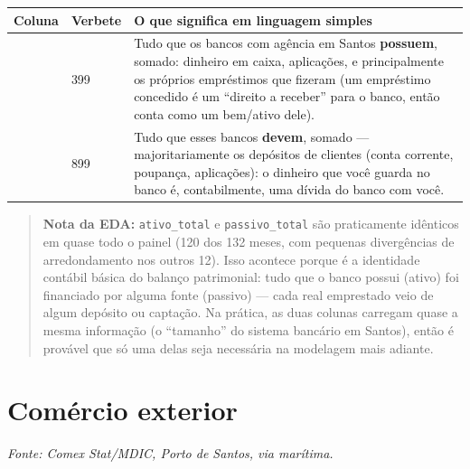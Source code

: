 \documentclass[11pt,a4paper]{article}
\begin{document}
\vspace{0.5em}
\begin{longtable}{L{2.6cm} L{1.4cm} L{9.8cm}}
\toprule
\textbf{Coluna} & \textbf{Verbete} & \textbf{O que significa em linguagem simples} \\
\midrule
\endhead
\texttt{} & 399 &
Tudo que os bancos com agência em Santos \textbf{possuem}, somado: dinheiro em caixa, aplicações, e principalmente os próprios empréstimos que fizeram (um empréstimo concedido é um ``direito a receber'' para o banco, então conta como um bem/ativo dele). \\[0.4em]
\texttt{} & 899 &
Tudo que esses bancos \textbf{devem}, somado --- majoritariamente os depósitos de clientes (conta corrente, poupança, aplicações): o dinheiro que você guarda no banco é, contabilmente, uma dívida do banco com você. \\
\bottomrule
\end{longtable}

\begin{quote}
\small\textbf{Nota da EDA:} \texttt{ativo\_total} e \texttt{passivo\_total} são praticamente idênticos em quase todo o painel (120 dos 132 meses, com pequenas divergências de arredondamento nos outros 12). Isso acontece porque é a identidade contábil básica do balanço patrimonial: tudo que o banco possui (ativo) foi financiado por alguma fonte (passivo) --- cada real emprestado veio de algum depósito ou captação. Na prática, as duas colunas carregam quase a mesma informação (o ``tamanho'' do sistema bancário em Santos), então é provável que só uma delas seja necessária na modelagem mais adiante.
\end{quote}

\section*{Comércio exterior}
\textit{Fonte: Comex Stat/MDIC, Porto de Santos, via marítima.}
\end{document}
